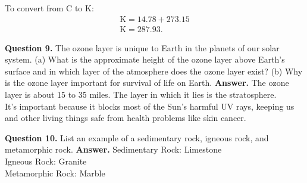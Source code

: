 \documentclass{report}
\begin{document}
    To convert from C to K:
    \begin{align*}
        \text{K} = 14.78 + 273.15 \\
        \text{K} = 287.93
    .\end{align*}

    \pagebreak \bigbreak \noindent 
    \textbf{Question 9.} The ozone layer is unique to Earth in the planets of our solar system.  (a) What is the approximate height of the ozone layer above Earth’s surface and in which layer of the atmosphere does the ozone layer exist?   (b) Why is the ozone layer important for survival of life on Earth. 
    \bigbreak \noindent 
    \textbf{Answer.} The ozone layer is about 15 to 35 miles. The layer in which it lies is the stratosphere. \\
    It's important because it blocks most of the Sun's harmful UV rays, keeping us and other living things safe from health problems like skin cancer.

    \bigbreak \noindent 
    \textbf{Question 10.} List an example of a sedimentary rock, igneous rock, and metamorphic rock.
    \bigbreak \noindent 
    \textbf{Answer.} Sedimentary Rock: Limestone \\
        Igneous Rock: Granite \\
        Metamorphic Rock: Marble
\end{document}
